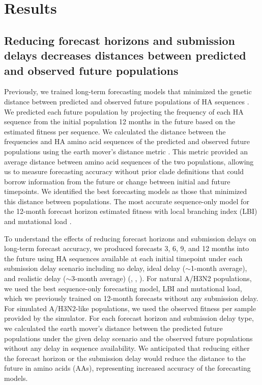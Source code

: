 \documentclass[9pt,lineno]{elife}
\begin{document}
\section{Results}

\subsection{Reducing forecast horizons and submission delays decreases distances between predicted and observed future populations}

Previously, we trained long-term forecasting models that minimized the genetic distance between predicted and observed future populations of HA sequences \citep{Huddleston2020}.
We predicted each future population by projecting the frequency of each HA sequence from the initial population 12 months in the future based on the estimated fitness per sequence.
We calculated the distance between the frequencies and HA amino acid sequences of the predicted and observed future populations using the earth mover's distance metric \citep{Rubner1998}.
This metric provided an average distance between amino acid sequences of the two populations, allowing us to measure forecasting accuracy without prior clade definitions that could borrow information from the future or change between initial and future timepoints.
We identified the best forecasting models as those that minimized this distance between populations.
The most accurate sequence-only model for the 12-month forecast horizon estimated fitness with local branching index (LBI) \citep{Neher:2014eu} and mutational load \citep{Luksza:2014hj}.

To understand the effects of reducing forecast horizons and submission delays on long-term forecast accuracy, we produced forecasts 3, 6, 9, and 12 months into the future using HA sequences available at each initial timepoint under each submission delay scenario including no delay, ideal delay ($\sim$1-month average), and realistic delay ($\sim$3-month average) (, , ).
For natural A/H3N2 populations, we used the best sequence-only forecasting model, LBI and mutational load, which we previously trained on 12-month forecasts without any submission delay.
For simulated A/H3N2-like populations, we used the observed fitness per sample provided by the simulator.
For each forecast horizon and submission delay type, we calculated the earth mover's distance between the predicted future populations under the given delay scenario and the observed future populations without any delay in sequence availability.
We anticipated that reducing either the forecast horizon or the submission delay would reduce the distance to the future in amino acids (AAs), representing increased accuracy of the forecasting models.
\end{document}

